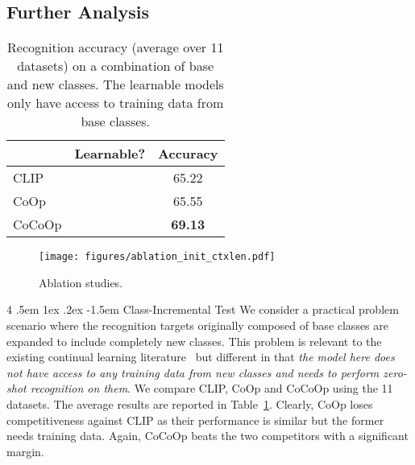 \documentclass[10pt,twocolumn,letterpaper]{article}
\makeatletter
\renewcommand\paragraph{
  \@startsection{paragraph} {4} {\z@} {.5em \@plus1ex \@minus.2ex} {-1.5em} {\normalfont\normalsize\bfseries} }
\newcommand{\tableCellHeight}{1}
\newcommand{\tabstyle}[1]{
  \setlength{\tabcolsep}{#1}
  \renewcommand{\arraystretch}{\tableCellHeight}
  \centering
  \small
}
\makeatother
\begin{document}
\subsection{Further Analysis}
\label{sec:experiments;subsec:further_analysis}

\begin{table}[t]
    \tabstyle{8pt}
    \caption{Recognition accuracy (average over 11 datasets) on a combination of base and new classes. The learnable models only have access to training data from base classes.
    }
    \label{tab:cls_incre_test}
    \begin{tabular}{l cc}
    \toprule
    & Learnable? & Accuracy \\
    \midrule
    CLIP~\cite{radford2021learning} & & 65.22 \\
    CoOp~\cite{zhou2021coop} &  & 65.55 \\
    CoCoOp &  & \textbf{69.13} \\
    \bottomrule
    \end{tabular}
\end{table}

\begin{figure}[t]
    \centering
    \texttt{[image: figures/ablation\_init\_ctxlen.pdf]}
    \caption{Ablation studies.}
    \label{fig:ablation_init_ctxlen}
\end{figure}

\paragraph{Class-Incremental Test}
We consider a practical problem scenario where the recognition targets originally composed of base classes are expanded to include completely new classes. This problem is relevant to the existing continual learning literature~\cite{parisi2019continual} but different in that \emph{the model here does not have access to any training data from new classes and needs to perform zero-shot recognition on them}. We compare CLIP, CoOp and CoCoOp using the 11 datasets. The average results are reported in Table~\ref{tab:cls_incre_test}. Clearly, CoOp loses competitiveness against CLIP as their performance is similar but the former needs training data. Again, CoCoOp beats the two competitors with a significant margin.
\end{document}
